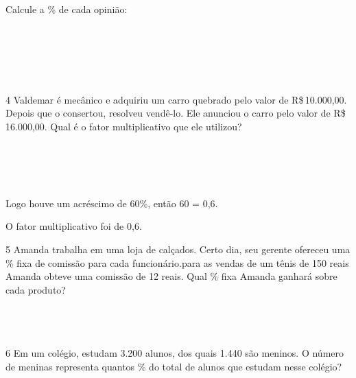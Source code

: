Calcule a \% de cada opinião:

\\
\\
\\
\\
\\

\num{4} Valdemar é mecânico e adquiriu um carro quebrado pelo valor de
R\$\,10.000,00. Depois que o consertou, resolveu vendê-lo. Ele anunciou o
carro pelo valor de R\$\,16.000,00. Qual é o fator multiplicativo que ele
utilizou?

\\
\\
\\
\\

Logo houve um acréscimo de 60\%, então 60  = 0,6.

O fator multiplicativo foi de 0,6.

\num{5} Amanda trabalha em uma loja de calçados. Certo dia, seu gerente
ofereceu uma \% fixa de comissão para cada funcionário.para as vendas de
um tênis de 150 reais Amanda obteve uma comissão de 12 reais. Qual \%
fixa Amanda ganhará sobre cada produto?

\\
\\
\\

\num{6} Em um colégio, estudam 3.200 alunos, dos quais 1.440 são meninos. O
número de meninas representa quantos \% do total de alunos que estudam
nesse colégio?

\\
\\
\\

